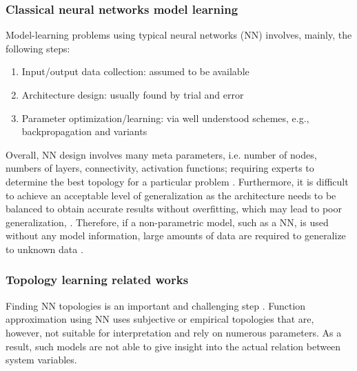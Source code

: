 \subsubsection{Classical neural networks model learning}
Model-learning problems using typical neural networks (NN) involves, mainly, the following steps:
\begin{enumerate}
	\item Input/output data collection: assumed to be available
	\item Architecture design: usually found by trial and error
	\item Parameter optimization/learning: via well understood schemes, e.g., backpropagation and variants
\end{enumerate}
Overall, NN design involves many meta parameters, i.e. number of nodes, numbers of layers, connectivity, activation functions; requiring experts to determine the best topology for a particular problem \cite{Matteucci2006ELeaRNTEvolutionarylearning}. Furthermore, it is difficult to achieve an acceptable level of generalization \cite{Rocha2005Simultaneousevolutionneural}\cite{He2015Topologicaloptimisationartificial}\cite{Matteucci2006ELeaRNTEvolutionarylearning}\cite{Kwok1995Constructivefeedforwardneural}\cite{Lawrence1998Whatsizeneural}\cite{Talebi2010NeuralNetworkBased} as the architecture needs to be balanced to obtain accurate results without overfitting, which may lead to poor generalization, \cite{He2015Topologicaloptimisationartificial}\cite{Muzhou2013NewConstructiveMethod}\cite{Talebi2010NeuralNetworkBased}. Therefore, if a non-parametric model, such as a NN, is used without any model information, large amounts of data are required to generalize to unknown data \cite{Urolagin2012Generalizationcapabilityartificial}.

\subsubsection{Topology learning related works}
Finding NN topologies is an important and challenging step \cite{Miikkulainen2017EvolvingDeepNeural}\cite{Rocha2005Simultaneousevolutionneural}\cite{Baker2017Designingneuralnetwork}. Function approximation using NN uses subjective or empirical topologies that are, however, not suitable for interpretation and rely on numerous parameters. As a result, such models are not able to give insight into the actual relation between system variables. 

